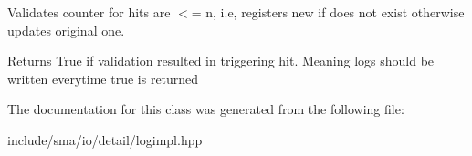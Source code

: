 Validates counter for hits are $<$= n, i.\-e, registers new if does not exist otherwise updates original one. 

\begin{DoxyReturn}{Returns}
True if validation resulted in triggering hit. Meaning logs should be written everytime true is returned 
\end{DoxyReturn}


The documentation for this class was generated from the following file\-:\begin{DoxyCompactItemize}
\item 
include/sma/io/detail/logimpl.\-hpp\end{DoxyCompactItemize}
